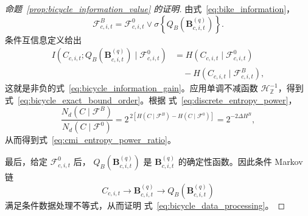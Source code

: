 \begin{proof}[命题~\ref{prop:bicycle_information_value} 的证明]
由式~\eqref{eq:bike_information}，
\[
\mathcal{F}^{B}_{c,i,t}
=
\mathcal{F}^{0}_{c,i,t}
\vee
\sigma\!\left\{Q_B(\mathbf{B}^{(q)}_{c,i,t})\right\}.
\]
条件互信息定义给出
\begin{align*}
I\!\left(
C_{c,i,t};
Q_B(\mathbf{B}^{(q)}_{c,i,t})
\mid\mathcal{F}^{0}_{c,i,t}
\right)
&=
H(C_{c,i,t}\mid\mathcal{F}^{0}_{c,i,t})\\
&\quad-
H(C_{c,i,t}\mid\mathcal{F}^{B}_{c,i,t}),
\end{align*}
这就是非负的式~\eqref{eq:bicycle_information_gain}。应用单调不减函数
\(\mathcal H_{\mathbb Z}^{-1}\)，得到
式~\eqref{eq:bicycle_exact_bound_order}。根据
式~\eqref{eq:discrete_entropy_power}，
\[
\frac{N_d(C\mid\mathcal{F}^{B})}
{N_d(C\mid\mathcal{F}^{0})}
=
2^{\,2[H(C\mid\mathcal{F}^{B})-H(C\mid\mathcal{F}^{0})]}
=
2^{-2\Delta H^B},
\]
从而得到式~\eqref{eq:cmi_entropy_power_ratio}。

最后，给定 \(\mathcal F^0_{c,i,t}\) 后，
\(Q_B(\mathbf B^{(q)}_{c,i,t})\) 是
\(\mathbf B^{(q)}_{c,i,t}\) 的确定性函数。因此条件 Markov 链
\[
C_{c,i,t}
\longrightarrow
\mathbf{B}^{(q)}_{c,i,t}
\longrightarrow
Q_B(\mathbf{B}^{(q)}_{c,i,t})
\]
满足条件数据处理不等式，从而证明
式~\eqref{eq:bicycle_data_processing}。
\end{proof}
